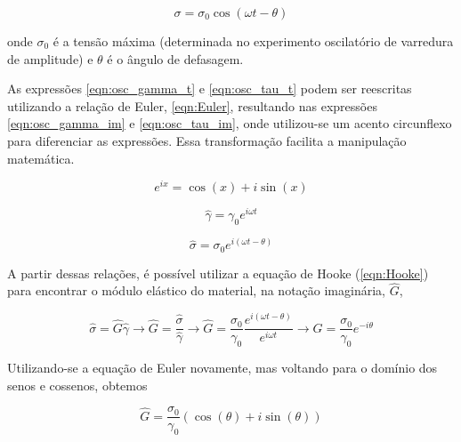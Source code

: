 			\begin{equation}
				\sigma = \sigma_0\cos(\omega t - \theta)
				\label{eqn:osc_tau_t}
			\end{equation} 
			
			\noindent onde \(\sigma_0\) é a tensão máxima (determinada no experimento oscilatório de varredura de amplitude) e \(\theta\) é o ângulo de defasagem.
			
			As expressões \ref{eqn:osc_gamma_t} e \ref{eqn:osc_tau_t} podem ser reescritas utilizando a relação de Euler, \autoref{eqn:Euler}, resultando nas expressões \ref{eqn:osc_gamma_im} e \ref{eqn:osc_tau_im}, onde utilizou-se um acento circunflexo para diferenciar as expressões. Essa transformação facilita a manipulação matemática.
			
			\begin{equation}
				e^{ix} = \cos(x) + i\sin(x)
				\label{eqn:Euler}
			\end{equation} %
			
			\begin{equation}
				\hat{\gamma} = \gamma_0 e^{i\omega t}
				\label{eqn:osc_gamma_im}
			\end{equation}
			
			\begin{equation}
				\hat{\sigma} = \sigma_0 e^{i(\omega t - \theta)}
				\label{eqn:osc_tau_im}
			\end{equation}
			
			A partir dessas relações, é possível utilizar a equação de Hooke (\autoref{eqn:Hooke}) para encontrar o módulo elástico do material, na notação imaginária, \(\hat{G}\),
			
			\begin{equation}
				\hat{\sigma} = \hat{G}\hat{\gamma} \to \hat{G} = \dfrac{\hat{\sigma}}{\hat{\gamma}}    \to 
				\hat{G} = \dfrac{\sigma_0}{\gamma_0} \dfrac{e^{i(\omega t - \theta)}}{e^{i\omega t}} \to
				\hat{G} = \dfrac{\sigma_0}{\gamma_0} e^{-i\theta}
				\label{eqn:osc_transform_G}
			\end{equation}
			
			Utilizando-se a equação de Euler novamente, mas voltando para o domínio dos senos e cossenos, obtemos
			
			\begin{equation}
				\hat{G} = \dfrac{\sigma_0}{\gamma_0} \left( \cos(\theta) + i\sin(\theta) \right)
				\label{eqn:osc_volta_senos_G}
			\end{equation}
			
